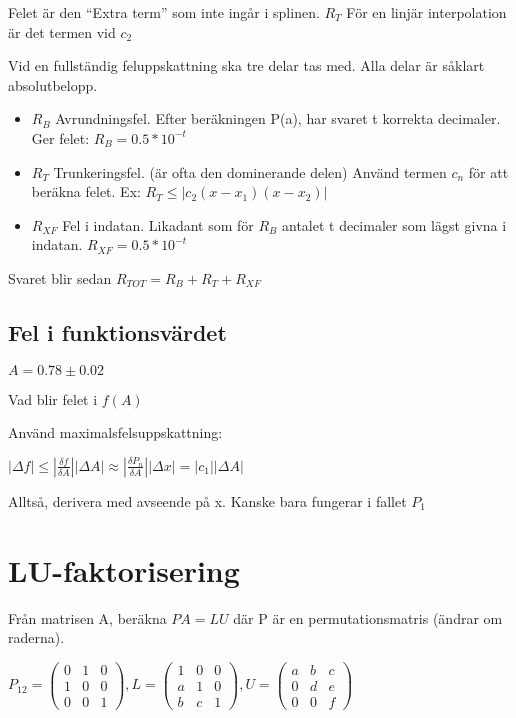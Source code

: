 \documentclass[12pt,a4paper]{article}
\begin{document}
Felet är den ``Extra term'' som inte ingår i splinen. $R_T$
För en linjär interpolation är det termen vid $c_2$

Vid en fullständig feluppskattning ska tre delar tas med.
Alla delar är såklart absolutbelopp.

\begin{itemize}
\item{$R_B$ Avrundningsfel.
Efter beräkningen P(a), har svaret t korrekta decimaler. \\Ger felet: $ R_B = 0.5 * 10^{-t}$}
\item{$R_T$ Trunkeringsfel.
(är ofta den dominerande delen)
Använd termen $c_n$ för att beräkna felet.
Ex: $ R_T \leq |c_2 (x-x_1)(x-x_2)|$
}
\item{$R_{XF}$ Fel i indatan.
Likadant som för $R_B$ antalet t decimaler som lägst givna i indatan.
$R_{XF} = 0.5 * 10^{-t}$}
\end{itemize}

Svaret blir sedan $R_{TOT} = R_B + R_T + R_{XF}$

\subsection{Fel i funktionsvärdet}

\Large
$A = 0.78 \pm 0.02$

\normalsize
Vad blir felet i $f(A)$

Använd maximalsfelsuppskattning:

\Large
$|\Delta f| \leq |\frac{\delta f}{\delta A}| |\Delta A| \approx |\frac{\delta P_n}{\delta A}| |\Delta x| = |c_1||\Delta A|$ 

\normalsize
Alltså, derivera med avseende på x. Kanske bara fungerar i fallet $P_1$

\section{LU-faktorisering}
Från matrisen A, beräkna $PA=LU$ där P är en permutationsmatris (ändrar om raderna).

$P_{12} = 
\begin{pmatrix}
0 & 1 & 0 \\
1 & 0 & 0 \\
0 & 0 & 1
\end{pmatrix}
,
L = 
\begin{pmatrix}
1 & 0 & 0 \\
a & 1 & 0 \\
b & c & 1
\end{pmatrix}
,
U = 
\begin{pmatrix}
a & b & c \\
0 & d & e \\
0 & 0 & f
\end{pmatrix}
$
\end{document}
